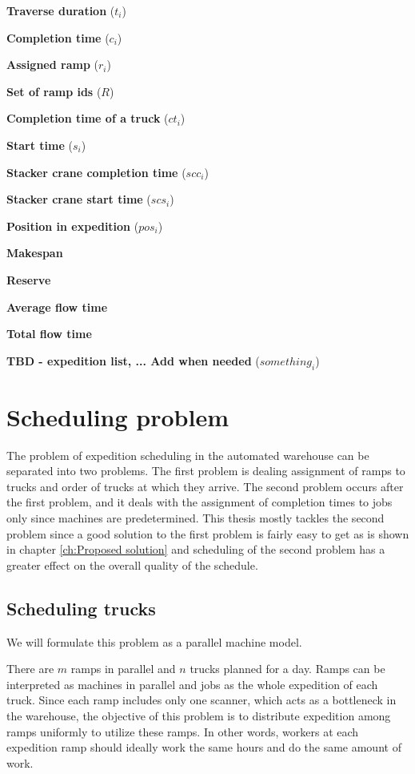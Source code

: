 \documentclass{ctuthesis}
\begin{document}
\noindent \textbf{Traverse duration} ($t_i$)

\noindent \textbf{Completion time} ($c_i$)

\noindent \textbf{Assigned ramp} ($r_i$)

\noindent \textbf{Set of ramp ids} ($R$)

\noindent \textbf{Completion time of a truck} ($ct_i$)

\noindent \textbf{Start time} ($s_i$)

\noindent \textbf{Stacker crane completion time} ($scc_i$)

\noindent \textbf{Stacker crane start time} ($scs_i$)

\noindent \textbf{Position in expedition} ($pos_i$)

\noindent \textbf{Makespan}

\noindent \textbf{Reserve}

\noindent \textbf{Average flow time}

\noindent \textbf{Total flow time}

\noindent \textbf{TBD - expedition list, ... Add when needed} ($something_i$)


\section{Scheduling problem}
 
 The problem of expedition scheduling in the automated warehouse can be separated into two problems. The first problem is dealing assignment of ramps to trucks and order of trucks at which they arrive. The second problem occurs after the first problem, and it deals with the assignment of completion times to jobs only since machines are predetermined. This thesis mostly tackles the second problem since a good solution to the first problem is fairly easy to get as is shown in chapter \ref{ch:Proposed solution} and scheduling of the second problem has a greater effect on the overall quality of the schedule.
 
 \subsection{Scheduling trucks}
 
 We will formulate this problem as a parallel machine model.
 
 There are $m$ ramps in parallel and $n$ trucks planned for a day. Ramps can be interpreted as machines in parallel and jobs as the whole expedition of each truck. Since each ramp includes only one scanner, which acts as a bottleneck in the warehouse, the objective of this problem is to distribute expedition among ramps uniformly to utilize these ramps. In other words, workers at each expedition ramp should ideally work the same hours and do the same amount of work.
 
\end{document}
